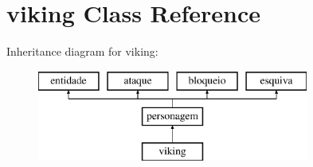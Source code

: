 \hypertarget{classviking}{}\section{viking Class Reference}
\label{classviking}
Inheritance diagram for viking\+:\begin{figure}[H]
\begin{center}
\leavevmode
\includegraphics[height=3.000000cm]{classviking}
\end{center}
\end{figure}
